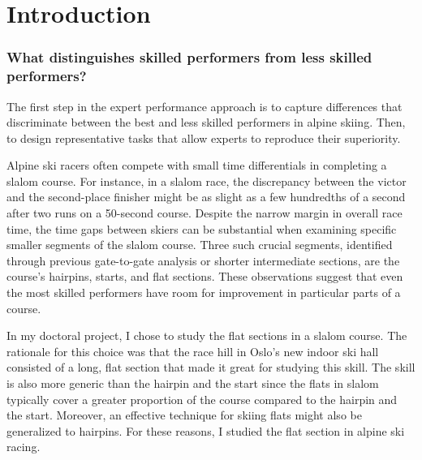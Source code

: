 \documentclass{report}
\begin{document}

\chapter{Introduction}

\subsection{What distinguishes skilled performers from less skilled performers?}

The first step in the expert performance approach \cite{williams_using_2017, ericsson_prospects_2002, williams_perceptual-cognitive_2005} is to capture differences that discriminate between the best and less skilled performers in alpine skiing. Then, to design representative tasks that allow experts to reproduce their superiority.

Alpine ski racers often compete with small time differentials in completing a slalom course. For instance, in a slalom race, the discrepancy between the victor and the second-place finisher might be as slight as a few hundredths of a second after two runs on a 50-second course. Despite the narrow margin in overall race time, the time gaps between skiers can be substantial when examining specific smaller segments of the slalom course. Three such crucial segments, identified through previous gate-to-gate analysis or shorter intermediate sections, are the course's hairpins, starts, and flat sections\cite{supej_new_2011}. These observations suggest that even the most skilled performers have room for improvement in particular parts of a course.

In my doctoral project, I chose to study the flat sections in a slalom course. The rationale for this choice was that the race hill in Oslo's new indoor ski hall consisted of a long, flat section that made it great for studying this skill. The skill is also more generic than the hairpin and the start since the flats in slalom typically cover a greater proportion of the course compared to the hairpin and the start. Moreover, an effective technique for skiing flats might also be generalized to hairpins. For these reasons, I studied the flat section in alpine ski racing. 
\end{document}
